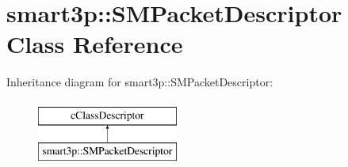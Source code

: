 \hypertarget{classsmart3p_1_1SMPacketDescriptor}{}\section{smart3p\+:\+:S\+M\+Packet\+Descriptor Class Reference}
\label{classsmart3p_1_1SMPacketDescriptor}
Inheritance diagram for smart3p\+:\+:S\+M\+Packet\+Descriptor\+:\begin{figure}[H]
\begin{center}
\leavevmode
\includegraphics[height=2.000000cm]{classsmart3p_1_1SMPacketDescriptor}
\end{center}
\end{figure}
